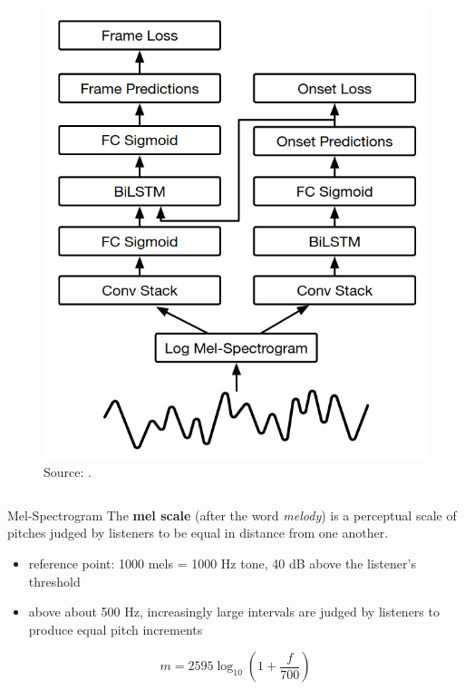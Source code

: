 \documentclass{beamer}
\newcommand{\emp}[1]{\textcolor{tum}{\textbf{#1}}}
\begin{document}
\begin{frame}[allowframebreaks]
\begin{columns}
		\begin{column}{0.6\textwidth}
			\begin{figure}[!ht]
				\centering
				\includegraphics[width=.7\textwidth]{OF.png}
				\caption{Source: \cite{OF}.}
				\label{fig:OF}
			\end{figure}
		\end{column}
	\end{columns}




	\framebreak

	\begin{block}{Mel-Spectrogram}
		The \emp{mel scale} (after the word \textit{melody})
		is a perceptual scale of pitches judged by listeners to be equal in distance from one another.

		\begin{itemize}
			\item reference point: 1000 mels = 1000 Hz tone, 40 dB above the listener's threshold
			\item above about 500 Hz, increasingly large intervals are judged by listeners to produce equal pitch increments
		\end{itemize}



	\end{block}

	\framebreak

	\begin{equation*}
		m = 2595\log_{10}\left(1+\frac{f}{700}\right)
	\end{equation*}


\end{frame}
\end{document}
